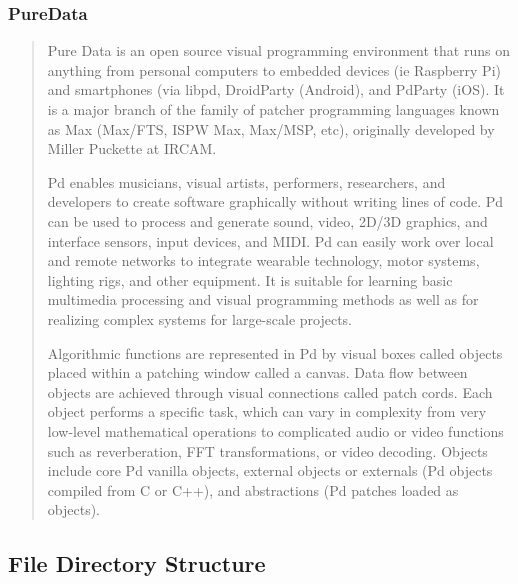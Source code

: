 \documentclass[12pt,a4paper]{article}
\begin{document}
\subsubsection{PureData}

\begin{quote}
Pure Data is an open source visual programming environment that runs on anything from personal computers to embedded devices (ie Raspberry Pi) and smartphones (via libpd, DroidParty (Android), and PdParty (iOS). It is a major branch of the family of patcher programming languages known as Max (Max/FTS, ISPW Max, Max/MSP, etc), originally developed by Miller Puckette at IRCAM.

Pd enables musicians, visual artists, performers, researchers, and developers to create software graphically without writing lines of code. Pd can be used to process and generate sound, video, 2D/3D graphics, and interface sensors, input devices, and MIDI. Pd can easily work over local and remote networks to integrate wearable technology, motor systems, lighting rigs, and other equipment. It is suitable for learning basic multimedia processing and visual programming methods as well as for realizing complex systems for large-scale projects.

Algorithmic functions are represented in Pd by visual boxes called objects placed within a patching window called a canvas. Data flow between objects are achieved through visual connections called patch cords. Each object performs a specific task, which can vary in complexity from very low-level mathematical operations to complicated audio or video functions such as reverberation, FFT transformations, or video decoding. Objects include core Pd vanilla objects, external objects or externals (Pd objects compiled from C or C++), and abstractions (Pd patches loaded as objects). \cite{puredata}
\end{quote}

\pagebreak
\subsection{File Directory Structure}

\end{document}

